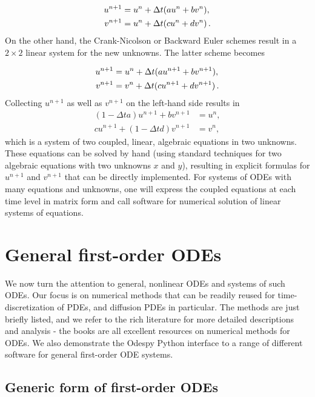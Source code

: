\documentclass[%
oneside,                 %
final,                   %
10pt]{article}
\begin{document}
\begin{align}
u^{n+1} &= u^n + \Delta t (a u^n + b v^n),\\ 
v^{n+1} &= u^n + \Delta t (cu^n + dv^n)
\thinspace .
\end{align}
On the other hand, the Crank-Nicolson or Backward Euler schemes result in a
$2\times 2$ linear system for the new unknowns. The latter scheme becomes

\begin{align}
u^{n+1} &= u^n + \Delta t (a u^{n+1} + b v^{n+1}),\\ 
v^{n+1} &= v^n + \Delta t (c u^{n+1} + d v^{n+1})\thinspace .
\end{align}
Collecting $u^{n+1}$ as well as $v^{n+1}$ on the left-hand side results
in
\begin{align}
(1 - \Delta t a)u^{n+1} + bv^{n+1} &= u^n ,\\ 
c u^{n+1} + (1 - \Delta t d) v^{n+1} &= v^n ,
\end{align}
which is a system of two coupled, linear, algebraic equations in two
unknowns. These equations can be solved by hand (using standard
techniques for two algebraic equations with two unknowns $x$ and $y$),
resulting in explicit formulas for $u^{n+1}$ and $v^{n+1}$ that can be
directly implemented. For systems of ODEs with many equations and unknowns, one
will express the coupled equations at each time level in matrix form
and call software for numerical solution of linear systems of equations.


\section{General first-order ODEs}

We now turn the attention to general, nonlinear ODEs and systems of
such ODEs.  Our focus is on numerical methods that can be readily
reused for time-discretization of PDEs, and diffusion PDEs in particular.
The methods are just briefly listed, and we refer to the rich literature
for more detailed descriptions and analysis - the books
\cite{Petzold_Ascher_1998,Griffiths_et_al_2010,Hairer_Wanner_Norsett_bookI,Hairer_Wanner_bookII} are all excellent resources on numerical methods for ODEs.
We also demonstrate the Odespy Python interface to a range
of different software for general first-order ODE systems.

\subsection{Generic form of first-order ODEs}
\end{document}
